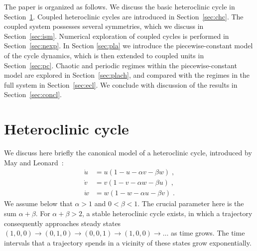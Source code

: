 \documentclass[3p,number,review,sort&compress]{elsarticle}
\begin{document}
The paper is organized as follows. We discuss the basic heteroclinic cycle in Section~\ref{sec:hc}. Coupled heteroclinic cycles are introduced in Section~\ref{sec:chc}. The coupled system possesses several symmetries, which we discuss in Section~\ref{sec:ism}. Numerical exploration of coupled cycles is performed in Section~\ref{sec:nexp}. In Section \ref{sec:pla} we introduce 
the piecewise-constant model of the cycle dynamics, which is then extended to coupled units
in Section~\ref{sec:pc}. Chaotic and periodic regimes within the piecewise-constant model are explored in Section~\ref{sec:plach}, and compared with the regimes in the full system in Section~\ref{sec:ecl}. We conclude
with discussion of the results in Section~\ref{sec:concl}.

\section{Heteroclinic cycle}
\label{sec:hc}

We discuss here briefly the canonical model of a heteroclinic cycle,
introduced by May and Leonard~\cite{May-Leonard-75}:
\begin{equation}
\begin{aligned}
\dot u&=u(1-u-\alpha v-\beta w)\;,\\
\dot v&=v(1-v-\alpha w-\beta u)\;,\\
\dot w&=w(1-w-\alpha u-\beta v)\;.
\end{aligned}
\label{eq:hc1}
\end{equation}
We assume below that $\alpha>1$ and $0<\beta<1$. The crucial parameter 
here is the sum $\alpha+\beta$. For $\alpha+\beta>2$, a stable heteroclinic cycle exists, in which a trajectory consequently approaches steady states $(1,0,0)\to(0,1,0)\to(0,0,1)\to(1,0,0)\to\ldots$ as time grows. The time intervals 
that a trajectory spends in a vicinity of these states grow exponentially.
\end{document}
